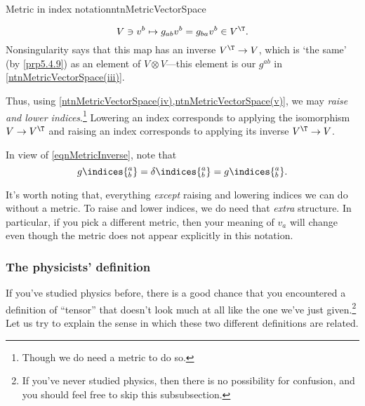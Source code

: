 \begin{ntn}{Metric in index notation}{ntnMetricVectorSpace}
\begin{rmk}
		\begin{equation}
			V\ni v^b\mapsto g_{ab}v^b=g_{ba}v^b\in V^{\T}.
		\end{equation}
		Nonsingularity says that this map has an inverse $V^{\T}\rightarrow V$, which is `the same' (by \cref{prp5.4.9}) as an element of $V\otimes V$---this element is our $g^{ab}$ in \cref{ntnMetricVectorSpace(iii)}.
	\end{rmk}
	\begin{rmk}
		Thus, using \cref{ntnMetricVectorSpace(iv),ntnMetricVectorSpace(v)}, we may \emph{raise and lower indices}.\footnote{Though we do need a metric to do so.}  Lowering an index corresponds to applying the isomorphism $V\rightarrow V^{\T}$ and raising an index corresponds to applying its inverse $V^{\T}\rightarrow V$.
	\end{rmk}
	\begin{rmk}
		In view of \eqref{eqnMetricInverse}, note that
		\begin{equation}
			g\indices{^a_b}=\delta \indices{^a_b}=g\indices{_b^a}.
		\end{equation}
	\end{rmk}
\end{ntn}
It's worth noting that, everything \emph{except} raising and lowering indices we can do without a metric.  To raise and lower indices, we do need that \emph{extra} structure.  In particular, if you pick a different metric, then your meaning of $v_a$ will change even though the metric does not appear explicitly in this notation.

\subsubsection{The physicists' definition}

If you've studied physics before, there is a good chance that you encountered a definition of ``tensor'' that doesn't look much at all like the one we've just given.\footnote{If you've never studied physics, then there is no possibility for confusion, and you should feel free to skip this subsubsection.}  Let us try to explain the sense in which these two different definitions are related.

